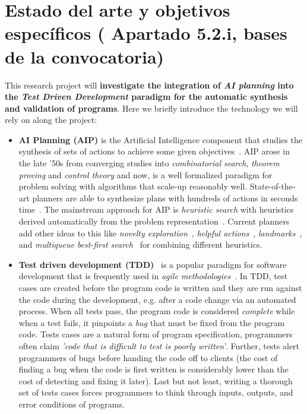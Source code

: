\documentclass[10pt,a4paper]{paper}
\begin{document}
\section{Estado del arte y objetivos específicos ( Apartado 5.2.i, bases de la convocatoria)}

This research project will {\bf investigate the integration of {\em AI planning} into the {\em Test Driven Development} paradigm for the automatic synthesis and validation of programs}. Here we briefly introduce the technology we will rely on along the project:
\begin{itemize}
\item {\bf AI Planning (AIP)} is the Artificial Intelligence component that studies the synthesis of sets of actions to achieve some given objectives~\cite{ghallab2004automated}. AIP arose in the late ’50s from converging studies into {\em combinatorial search}, {\em theorem proving} and {\em control theory} and now, is a well formalized paradigm for problem solving with algorithms that scale-up reasonably well. State-of-the-art planners are able to synthesize plans with hundreds of actions in seconds time~\cite{geffner2013concise}.  The mainstream approach for AIP is {\em heuristic search} with heuristics derived automatically from the problem representation~\cite{mcdermott1996heuristic,bonet2001planning}.  Current planners add other ideas to this like {\it novelty exploration}~\cite{geffner:psimulators:IJCAI17}, {\it helpful actions}~\cite{hoffmann2001ff}, {\it landmarks}~\cite{helmert2006fast}, and {\it multiqueue best-first search}~\cite{richter2010lama} for combining different heuristics.
  
\item {\bf Test driven development (TDD)}~\cite{beck:TDD:2003} is a popular paradigm for software development that is frequently used in {\it agile methodologies}~\cite{cohen2003agile}. In TDD, test cases are created before the program code is written and they are run against the code during the development, e.g. after a code change via an automated process. When all tests pass, the program code is considered {\em complete} while when a test fails, it pinpoints a {\em bug} that must be fixed from the program code. Tests cases are a natural form of program specification, programmers often claim {\em 'code that is difficult to test is poorly written'}. Further, tests alert programmers of bugs before handing the code off to clients (the cost of finding a bug when the code is first written is considerably lower than the cost of detecting and fixing it later). Last but not least, writing a thorough set of tests cases forces programmers to think through inputs, outputs, and error conditions of programs. 
\end{itemize}
\end{document}
